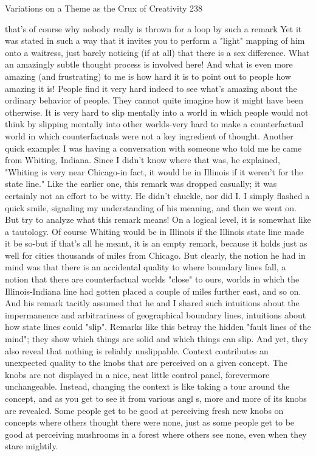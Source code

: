 Variations on a Theme as the Crux of Creativity                                     238

that's of course why nobody really is thrown for a loop by such a remark Yet it was
stated in such a way that it invites you to perform a "light" mapping of him onto a
waitress, just barely noticing (if at all) that there is a sex difference. What an
amazingly subtle thought process is involved here!
        And what is even more amazing (and frustrating) to me is how hard it is to
point out to people how amazing it is! People find it very hard indeed to see what's
amazing about the ordinary behavior of people. They cannot quite imagine how it
might have been otherwise. It is very hard to slip mentally into a world in which
people would not think by slipping mentally into other worlds-very hard to make a
counterfactual world in which counterfactuals were not a key ingredient of thought.
        Another quick example: I was having a conversation with someone who told
me he came from Whiting, Indiana. Since I didn't know where that was, he explained,
"Whiting is very near Chicago-in fact, it would be in Illinois if it weren't for the state
line." Like the earlier one, this remark was dropped casually; it was certainly not an
effort to be witty. He didn't chuckle, nor did I. I simply flashed a quick smile,
signaling my understanding of his meaning, and then we went on. But try to analyze
what this remark means! On a logical level, it is somewhat like a tautology. Of course
Whiting would be in Illinois if the Illinois state line made it be so-but if that's all he
meant, it is an empty remark, because it holds just as well for cities thousands of miles
from Chicago. But clearly, the notion he had in mind was that there is an accidental
quality to where boundary lines fall, a notion that there are counterfactual worlds
"close" to ours, worlds in which the Illinois-Indiana line had gotten placed a couple of
miles further east, and so on. And his remark tacitly assumed that he and I shared such
intuitions about the impermanence and arbitrariness of geographical boundary lines,
intuitions about how state lines could "slip".
        Remarks like this betray the hidden "fault lines of the mind"; they show which
things are solid and which things can slip. And yet, they also reveal that nothing is
reliably unslippable. Context contributes an unexpected quality to the knobs that are
perceived on a given concept. The knobs are not displayed in a nice, neat little control
panel, forevermore unchangeable. Instead, changing the context is like taking a tour
around the concept, and as you get to see it from various angl s, more and more of its
knobs are revealed. Some people get to be good at perceiving fresh new knobs on
concepts where others thought there were none, just as some people get to be good at
perceiving mushrooms in a forest where others see none, even when they stare
mightily.

